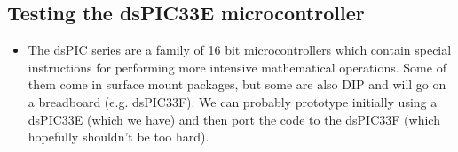 \documentclass{article}
\begin{document}

\subsection{Testing the dsPIC33E microcontroller}

\begin{itemize}
  \item The dsPIC series are a family of 16 bit microcontrollers which contain special instructions for performing more intensive mathematical operations. Some of them come in surface mount packages, but some are also DIP and will go on a breadboard (e.g. dsPIC33F). We can probably prototype initially using a dsPIC33E (which we have) and then port the code to the dsPIC33F (which hopefully shouldn't be too hard).
\end{itemize}
\end{document}
